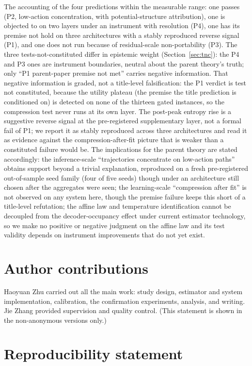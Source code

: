 \documentclass{article}
\begin{document}
The accounting of the four predictions within the measurable range: one passes
(P2, low-action concentration, with potential-structure attribution), one is
objected to on two layers under an instrument with resolution (P4), one has its
premise not hold on three architectures with a stably reproduced reverse signal
(P1), and one does not run because of residual-scale non-portability (P3). The
three tests-not-constituted differ in epistemic weight (Section~\ref{sec:tnc}):
the P4 and P3 ones are instrument boundaries, neutral about the parent theory's
truth; only ``P1 parent-paper premise not met'' carries negative information. That
negative information is graded, not a title-level falsification: the P1 verdict is
test not constituted, because the utility plateau (the premise the title
prediction is conditioned on) is detected on none of the thirteen gated
instances, so the compression test never runs at its own layer. The post-peak
entropy rise is a suggestive reverse signal at the pre-registered supplementary
layer, not a formal fail of P1; we report it as stably reproduced across three
architectures and read it as evidence against the compression-after-fit picture
that is weaker than a constituted failure would be. The implications for the
parent theory are stated accordingly: the inference-scale ``trajectories
concentrate on low-action paths'' obtains support beyond a trivial explanation,
reproduced on a fresh pre-registered out-of-sample seed family (four of five
seeds) though under an architecture still chosen after the aggregates were seen;
the learning-scale ``compression after fit'' is not observed on any system here,
though the premise failure keeps this short of a title-level refutation; the
affine law and temperature identification cannot be
decoupled from the decoder-occupancy effect under current estimator technology,
so we make no positive or negative judgment on the affine law and its test
validity depends on instrument improvements that do not yet exist.

\section*{Author contributions}

Haoyuan Zhu carried out all the main work: study design, estimator and system
implementation, calibration, the confirmation experiments, analysis, and
writing. Jie Zhang provided supervision and quality control. (This statement is
shown in the non-anonymous versions only.)

\section*{Reproducibility statement}
\end{document}
